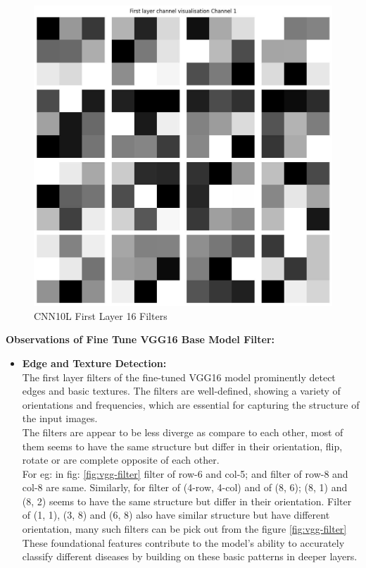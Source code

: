 \begin{figure}
    \centering
    \includegraphics[width=1\linewidth]{graphics//chapter7/CNN10L filter.png}
    \caption{CNN10L First Layer 16 Filters}
    \label{fig:cnn10l-filter}
\end{figure}

\textbf{Observations of Fine Tune VGG16 Base Model Filter: }

\begin{itemize}
    \item \textbf{Edge and Texture Detection:}\\
    The first layer filters of the fine-tuned VGG16 model prominently detect edges and basic textures. The filters are well-defined, showing a variety of orientations and frequencies, which are essential for capturing the structure of the input images.\\
    The filters are appear to be less diverge as compare to each other, most of them seems to have the same structure but differ in their orientation, flip, rotate or are complete opposite of each other.\\
    For eg: in fig: \ref{fig:vgg-filter} filter of row-6 and col-5; and filter of row-8 and col-8 are same. Similarly, for filter of (4-row, 4-col) and of (8, 6); (8, 1) and (8, 2) seems to have the same structure but differ in their orientation. Filter of (1, 1), (3, 8) and (6, 8) also have similar structure but have different orientation, many such filters can be pick out from the figure \ref{fig:vgg-filter}\\
    These foundational features contribute to the model’s ability to accurately classify different diseases by building on these basic patterns in deeper layers.
\end{itemize}

